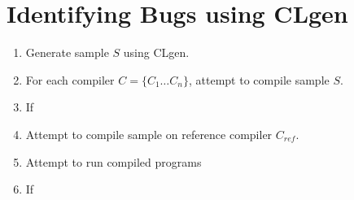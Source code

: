 






\section{Identifying Bugs using CLgen}

\begin{enumerate}
	\item Generate sample $S$ using CLgen.
	\item For each compiler $C = \{C_1 \ldots C_n\}$, attempt to compile sample $S$.
	\item If
	\item Attempt to compile sample on reference compiler $C_{ref}$.
	\item Attempt to run compiled programs
	\item If
\end{enumerate}



\printbibliography

